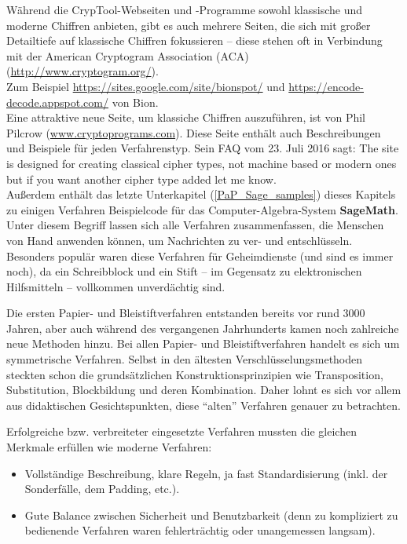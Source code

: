 \begin{refsegment}
{Während die CrypTool-Webseiten und -Programme sowohl klassische und moderne Chiffren
anbieten, gibt es auch mehrere Seiten, die sich mit großer Detailtiefe auf klassische
Chiffren fokussieren -- diese stehen oft in Verbindung mit der American Cryptogram
Association (ACA) (\url{http://www.cryptogram.org/}).\\
Zum Beispiel \url{https://sites.google.com/site/bionspot/} und
\url{https://encode-decode.appspot.com/} von Bion.\\
Eine attraktive neue Seite, um klassiche Chiffren auszuführen, ist von
Phil Pilcrow (\url{www.cryptoprograms.com}). Diese Seite enthält auch Beschreibungen
und Beispiele für jeden Verfahrenstyp. Sein FAQ vom 23. Juli 2016 sagt:
\glqq The site is designed for creating classical cipher types, not machine based
or modern ones but if you want another cipher type added let me know.\grqq {}\\

Außerdem enthält das letzte Unterkapitel (\ref{PaP_Sage_samples}) dieses Kapitels
zu einigen Verfahren Beispielcode für das Computer-Algebra-System \textbf{SageMath}.
   }
Unter diesem Begriff lassen sich alle Verfahren zusammenfassen, die Menschen von
Hand anwenden können, um Nachrichten zu ver- und entschlüsseln.
Besonders populär waren diese Verfahren für Geheimdienste (und
sind es immer noch), da ein Schreibblock und ein Stift -- im
Gegensatz zu elektronischen Hilfsmitteln -- vollkommen unverdächtig sind.

Die ersten Papier- und Bleistiftverfahren entstanden bereits vor rund
3000 Jahren, aber auch während des vergangenen Jahrhunderts kamen
noch zahlreiche neue Methoden hinzu. Bei allen Papier- und
Bleistiftverfahren handelt es sich um symmetrische
Verfahren. Selbst in den
ältesten Verschlüsselungsmethoden steckten schon die
grundsätzlichen Konstruktionsprinzipien wie Transposition,
Substitution, Blockbildung und deren Kombination. Daher
lohnt es sich vor allem aus didaktischen Gesichtspunkten,
diese "`alten"' Verfahren genauer zu betrachten.

Erfolgreiche bzw. verbreiteter eingesetzte Verfahren mussten die gleichen
Merkmale erfüllen wie moderne Verfahren:
\begin{itemize}
\item Vollständige Beschreibung, klare Regeln, ja fast Standardisierung
      (inkl. der Sonderfälle, dem Padding, etc.).
\item Gute Balance zwischen Sicherheit und Benutzbarkeit
      (denn zu kompliziert zu bedienende Verfahren waren fehlerträchtig
      oder unangemessen langsam).
\end{itemize}




\end{refsegment}
